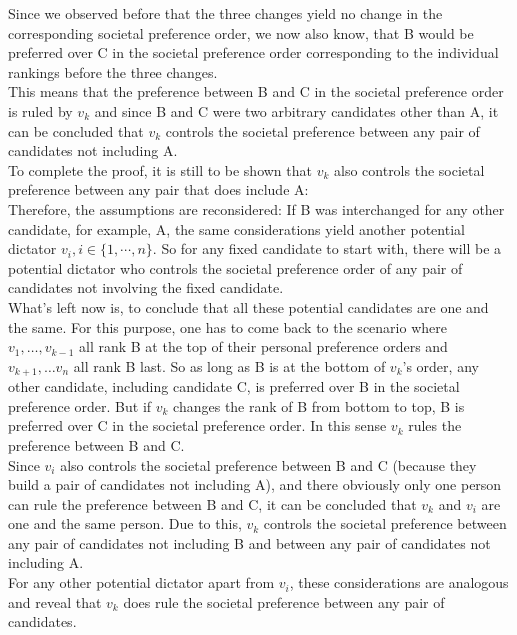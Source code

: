 Since we observed before that the three changes yield no change in the corresponding societal preference order, we now also know, that B would be preferred over C in the societal preference order corresponding to the individual rankings before the three changes. \\
\noindent This means that the preference between B and C in the societal preference order is ruled by $v_k$ and since B and C were two arbitrary candidates other than A, it can be concluded that $v_k$ controls the societal preference between any pair of candidates not including A. \\
To complete the proof, it is still to be shown that $v_k$ also controls the societal preference between any pair that does include A: \\
Therefore, the assumptions are reconsidered: If B was interchanged for any other candidate, for example, A, the same considerations yield another potential dictator $v_i, i \in \{1, \cdots, n\}$. So for any fixed candidate to start with, there will be a potential dictator who controls the societal preference order of any pair of candidates not involving the fixed candidate. \\
\noindent What's left now is, to conclude that all these potential candidates are one and the same. For this purpose, one has to come back to the scenario where $v_1, \dotsc, v_{k-1}$ all rank B at the top of their personal preference orders and $v_{k+1}, \dotsc v_n$ all rank B last. So as long as B is at the bottom of $v_k$'s order, any other candidate, including candidate C, is preferred over B in the societal preference order. But if $v_k$ changes the rank of B from bottom to top, B is preferred over C in the societal preference order. In this sense $v_k$ rules the preference between B and C. \\
Since $v_i$ also controls the societal preference between B and C (because they build a pair of candidates not including A), and there obviously only one person can rule the preference between B and C, it can be concluded that $v_k$ and $v_i$ are one and the same person. Due to this, $v_k$ controls the societal preference between any pair of candidates not including B and between any pair of candidates not including A. \\
For any other potential dictator apart from $v_i$, these considerations are analogous and reveal that $v_k$ does rule the societal preference between any pair of candidates. 



